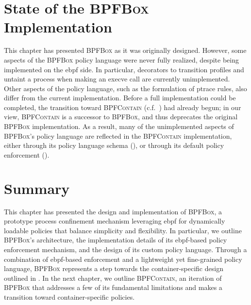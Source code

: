 \documentclass[
  fontsize=12pt,
  titlepage=firstiscover,
  paper=letter,
oneside,
  cleardoublepage=plain,
  parskip=half-,
  DIV=10,
  parindent,
  appendixprefix,
  chapterprefix,
  listof=totoc,
]{scrbook}
\newcommand{\bpfbox}{\textsc{BPFBox}}
\newcommand{\bpfcontain}{\textsc{BPFContain}}
\begin{document}
\section{State of the \bpfbox{} Implementation}
\label{s:bpfbox-discrepancies}

This chapter has presented \bpfbox{} as it was originally designed. However, some aspects
of the \bpfbox{} policy language were never fully realized, despite being implemented on
the \gls{ebpf} side. In particular, decorators to transition profiles and untaint
a process when making an execve call are currently unimplemented. Other aspects of the
policy language, such as the formulation of ptrace rules, also differ from the current
implementation. Before a full implementation could be completed, the transition toward
\bpfcontain{} (c.f.\ ) had already begun; in our view, \bpfcontain{} is
a successor to \bpfbox{}, and thus deprecates the original \bpfbox{} implementation. As
a result, many of the unimplemented aspects of \bpfbox{}'s policy language are reflected
in the \bpfcontain{} implementation, either through its policy language schema
(), or through its default policy enforcement
().



\section{Summary}\label{s:bpfbox-summary}

This chapter has presented the design and implementation of \bpfbox{}, a prototype process
confinement mechanism leveraging \gls{ebpf} for dynamically loadable policies that balance
simplicity and flexibility. In particular, we outline \bpfbox{}'s architecture, the
implementation details of its \gls{ebpf}-based policy enforcement mechanism, and the
design of its custom policy language. Through a combination of \gls{ebpf}-based
enforcement and a lightweight yet fine-grained policy language, \bpfbox{} represents
a step towards the container-specific design outlined in .  In the next
chapter, we outline \bpfcontain{}, an iteration of \bpfbox{} that addresses a few of its
fundamental limitations and makes a transition toward container-specific policies.

 
\end{document}
